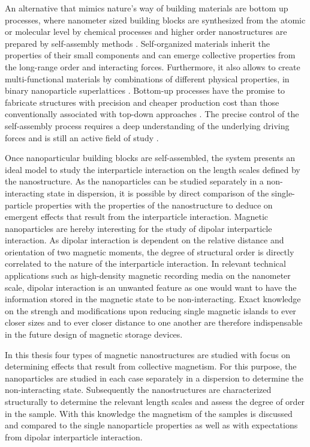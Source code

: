 \documentclass[\main/dresen_thesis.tex]{subfiles}
\begin{document}
  An alternative that mimics nature's way of building materials are bottom up processes, where nanometer sized building blocks are synthesized from the atomic or molecular level by chemical processes and higher order nanostructures are prepared by self-assembly methods \cite{Hannink_2006_Nanos, Whitesides_2002_Selfa}.
  Self-organized materials inherit the properties of their small components and can emerge collective properties from the long-range order and interacting forces.
  Furthermore, it also allows to create multi-functional materials by combinations of different physical properties, \eg in binary nanoparticle superlattices \cite{Redl_2003_Three}.
  Bottom-up processes have the promise to fabricate structures with precision and cheaper production cost than those conventionally associated with top-down approaches \cite{Hannink_2006_Nanos}.
  The precise control of the self-assembly process requires a deep understanding of the underlying driving forces and is still an active field of study \cite{Whitelam_2008_Thero, Powers_2016_Track, Josten_2017_Super}.

  Once nanoparticular building blocks are self-assembled, the system presents an ideal model to study the interparticle interaction on the length scales defined by the nanostructure.
  As the nanoparticles can be studied separately in a non-interacting state in dispersion, it is possible by direct comparison of the single-particle properties with the properties of the nanostructure to deduce on emergent effects that result from the interparticle interaction.
  Magnetic nanoparticles are hereby interesting for the study of dipolar interparticle interaction.
  As dipolar interaction is dependent on the relative distance and orientation of two magnetic moments, the degree of structural order is directly correlated to the nature of the interparticle interaction.
  In relevant technical applications such as high-density magnetic recording media on the nanometer scale, dipolar interaction is an unwanted feature as one would want to have the information stored in the magnetic state to be non-interacting.
  Exact knowledge on the strengh and modifications upon reducing single magnetic islands to ever closer sizes and to ever closer distance to one another are therefore indispensable in the future design of magnetic storage devices.

    In this thesis four types of magnetic nanostructures are studied with focus on determining effects that result from collective magnetism.
    For this purpose, the nanoparticles are studied in each case separately in a dispersion to determine the non-interacting state.
    Subsequently the nanostructures are characterized structurally to determine the relevant length scales and assess the degree of order in the sample.
    With this knowledge the magnetism of the samples is discussed and compared to the single nanoparticle properties as well as with expectations from dipolar interparticle interaction.
\end{document}
